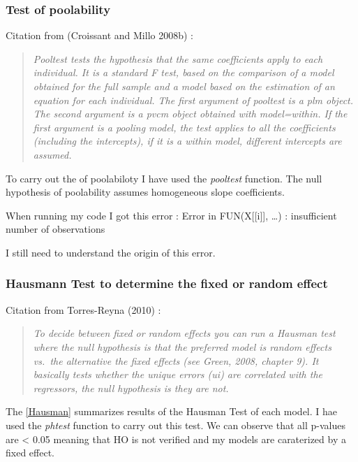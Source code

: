 \documentclass[12pt,]{article}
\begin{document}
\newpage

\subsubsection{Test of poolability}\label{test-of-poolability}

Citation from (Croissant and Millo 2008b) :

\begin{quote}
\emph{Pooltest tests the hypothesis that the same coefficients apply to
each individual. It is a standard F test, based on the comparison of a
model obtained for the full sample and a model based on the estimation
of an equation for each individual. The first argument of pooltest is a
plm object. The second argument is a pvcm object obtained with
model=within. If the first argument is a pooling model, the test applies
to all the coefficients (including the intercepts), if it is a within
model, different intercepts are assumed.}
\end{quote}

To carry out the of poolabiloty I have used the \emph{pooltest}
function. The null hypothesis of poolability assumes homogeneous slope
coefficients.

When running my code I got this error : Error in FUN(X{[}{[}i{]}{]},
\ldots{}) : insufficient number of observations

I still need to understand the origin of this error.

\subsubsection{Hausmann Test to determine the fixed or random
effect}\label{hausmann-test-to-determine-the-fixed-or-random-effect}

Citation from Torres-Reyna (2010) :

\begin{quote}
\emph{To decide between fixed or random effects you can run a Hausman
test where the null hypothesis is that the preferred model is random
effects vs.~the alternative the fixed effects (see Green, 2008, chapter
9). It basically tests whether the unique errors (ui) are correlated
with the regressors, the null hypothesis is they are not.}
\end{quote}

The \autoref{Hausman} summarizes results of the Hausman Test of each
model. I hae used the \emph{phtest} function to carry out this test. We
can observe that all p-values are \textless{} 0.05 meaning that HO is
not verified and my models are caraterized by a fixed effect.
\end{document}

